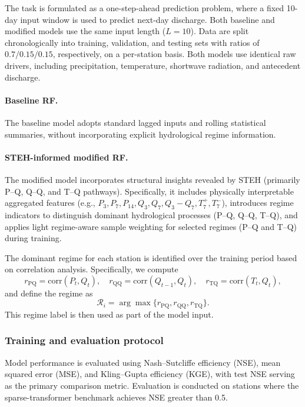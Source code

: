 \documentclass[11pt]{article}
\begin{document}
The task is formulated as a one-step-ahead prediction problem, where a fixed 10-day input window is used to predict next-day discharge. Both baseline and modified models use the same input length ($L=10$). Data are split chronologically into training, validation, and testing sets with ratios of $0.7/0.15/0.15$, respectively, on a per-station basis. Both models use identical raw drivers, including precipitation, temperature, shortwave radiation, and antecedent discharge.

\paragraph{Baseline RF.}
The baseline model adopts standard lagged inputs and rolling statistical summaries, without incorporating explicit hydrological regime information.

\paragraph{STEH-informed modified RF.}
The modified model incorporates structural insights revealed by STEH (primarily P--Q, Q--Q, and T--Q pathways). Specifically, it includes physically interpretable aggregated features (e.g., $P_{3}, P_{7}, P_{14}, Q_{3}, Q_{7}, Q_{3}-Q_{7}, T_{7}^{+}, T_{7}^{-}$), introduces regime indicators to distinguish dominant hydrological processes (P--Q, Q--Q, T--Q), and applies light regime-aware sample weighting for selected regimes (P--Q and T--Q) during training.

The dominant regime for each station is identified over the training period based on correlation analysis\cite{Wrr_p_q}. Specifically, we compute
\begin{equation}
    r_{\mathrm{PQ}} = \mathrm{corr}(P_t, Q_t),
    \quad
    r_{\mathrm{QQ}} = \mathrm{corr}(Q_{t-1}, Q_t),
    \quad
    r_{\mathrm{TQ}} = \mathrm{corr}(T_t, Q_t),
\end{equation}
and define the regime as
\begin{equation}
    \mathcal{R}_i = \arg\max\{r_{\mathrm{PQ}}, r_{\mathrm{QQ}}, r_{\mathrm{TQ}}\}.
\end{equation}
This regime label is then used as part of the model input.

\subsubsection*{Training and evaluation protocol}

Model performance is evaluated using Nash--Sutcliffe efficiency (NSE), mean squared error (MSE), and Kling--Gupta efficiency (KGE), with test NSE serving as the primary comparison metric\cite{Nse}. Evaluation is conducted on stations where the sparse-transformer benchmark achieves NSE greater than 0.5\cite{WRR_NSE}.
\end{document}
